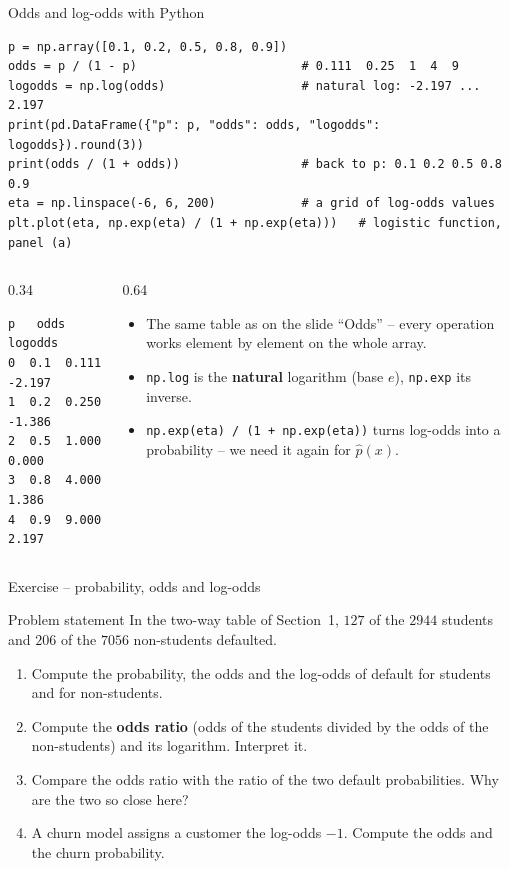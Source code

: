 \documentclass[aspectratio=169,11pt]{beamer}
\begin{document}
\begin{frame}[fragile]{Odds and log-odds with Python}
\begin{lstlisting}
p = np.array([0.1, 0.2, 0.5, 0.8, 0.9])
odds = p / (1 - p)                       # 0.111  0.25  1  4  9
logodds = np.log(odds)                   # natural log: -2.197 ... 2.197
print(pd.DataFrame({"p": p, "odds": odds, "logodds": logodds}).round(3))
print(odds / (1 + odds))                 # back to p: 0.1 0.2 0.5 0.8 0.9
eta = np.linspace(-6, 6, 200)            # a grid of log-odds values
plt.plot(eta, np.exp(eta) / (1 + np.exp(eta)))   # logistic function, panel (a)
\end{lstlisting}
  \begin{columns}[T]
    \begin{column}{0.34\textwidth}
\begin{lstlisting}[style=Pyout]
     p   odds  logodds
0  0.1  0.111   -2.197
1  0.2  0.250   -1.386
2  0.5  1.000    0.000
3  0.8  4.000    1.386
4  0.9  9.000    2.197
\end{lstlisting}
    \end{column}
    \begin{column}{0.64\textwidth}
      \small
      \begin{itemize}\setlength{\itemsep}{2pt}
        \item The same table as on the slide ``Odds'' -- every operation
              works element by element on the whole array.
        \item \texttt{np.log} is the \textbf{natural} logarithm (base $e$),
              \texttt{np.exp} its inverse.
        \item \texttt{np.exp(eta) / (1 + np.exp(eta))} turns log-odds into a
              probability -- we need it again for $\hat p(x)$.
      \end{itemize}
    \end{column}
  \end{columns}
\end{frame}

\begin{frame}{Exercise -- probability, odds and log-odds}
  \begin{block}{Problem statement}
    In the two-way table of Section~1, $127$ of the $2944$ students and $206$
    of the $7056$ non-students defaulted.
    \begin{enumerate}
      \item Compute the probability, the odds and the log-odds of default
            for students and for non-students.
      \item Compute the \textbf{odds ratio} (odds of the students divided by
            the odds of the non-students) and its logarithm. Interpret it.
      \item Compare the odds ratio with the ratio of the two default
            probabilities. Why are the two so close here?
      \item A churn model assigns a customer the log-odds $-1$. Compute the
            odds and the churn probability.
    \end{enumerate}
  \end{block}
\end{frame}
\end{document}
